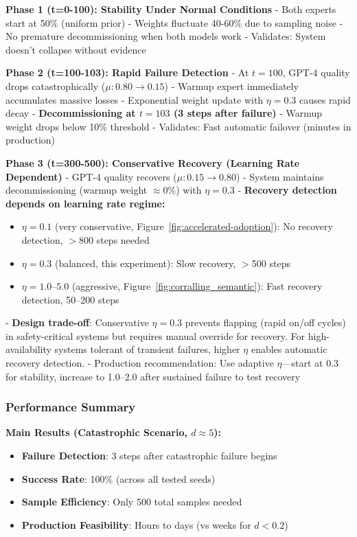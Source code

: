 \textbf{Phase 1 (t=0-100): Stability Under Normal Conditions}
- Both experts start at 50\% (uniform prior)
- Weights fluctuate 40-60\% due to sampling noise
- No premature decommissioning when both models work
- Validates: System doesn't collapse without evidence

\textbf{Phase 2 (t=100-103): Rapid Failure Detection}
- At $t=100$, GPT-4 quality drops catastrophically ($\mu: 0.80 \to 0.15$)
- Warmup expert immediately accumulates massive losses
- Exponential weight update with $\eta=0.3$ causes rapid decay
- \textbf{Decommissioning at $t=103$ (3 steps after failure)}
- Warmup weight drops below 10\% threshold
- Validates: Fast automatic failover (minutes in production)

\textbf{Phase 3 (t=300-500): Conservative Recovery (Learning Rate Dependent)}
- GPT-4 quality recovers ($\mu: 0.15 \to 0.80$)
- System maintains decommissioning (warmup weight $\approx 0\%$) with $\eta=0.3$
- \textbf{Recovery detection depends on learning rate regime:}
  \begin{itemize}
    \item $\eta=0.1$ (very conservative, Figure~\ref{fig:accelerated-adoption}): No recovery detection, $>$800 steps needed
    \item $\eta=0.3$ (balanced, this experiment): Slow recovery, $>$500 steps
    \item $\eta=1.0$--$5.0$ (aggressive, Figure~\ref{fig:corralling_semantic}): Fast recovery detection, 50--200 steps
  \end{itemize}
- \textbf{Design trade-off}: Conservative $\eta=0.3$ prevents flapping (rapid on/off cycles) in safety-critical systems but requires manual override for recovery. For high-availability systems tolerant of transient failures, higher $\eta$ enables automatic recovery detection.
- Production recommendation: Use adaptive $\eta$—start at 0.3 for stability, increase to 1.0--2.0 after sustained failure to test recovery

\subsubsection{Performance Summary}

\textbf{Main Results (Catastrophic Scenario, $d \approx 5$):}
\begin{itemize}
    \item \textbf{Failure Detection}: 3 steps after catastrophic failure begins
    \item \textbf{Success Rate}: 100\% (across all tested seeds)
    \item \textbf{Sample Efficiency}: Only 500 total samples needed
    \item \textbf{Production Feasibility}: Hours to days (vs weeks for $d < 0.2$)
\end{itemize}

